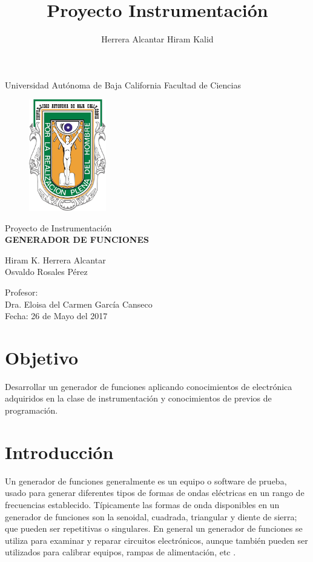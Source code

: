 \documentclass[11pt]{article}
\title{Proyecto Instrumentación}
\author{Herrera Alcantar Hiram Kalid}
\begin{document}
\begin{titlepage}
\begin{center}
\Huge Universidad Autónoma de Baja California
\huge Facultad de Ciencias
\vspace{0.8cm}
\begin{figure}[H]
\centering
\includegraphics[width=0.3\textwidth]{uabc}
\end{figure}
\huge Proyecto de Instrumentación\\
\huge\textbf{{GENERADOR DE FUNCIONES}}

\vspace{1.5cm}
\Huge{Hiram K. Herrera Alcantar \\ Osvaldo Rosales Pérez}

\vspace{1.5cm}
\huge{Profesor:}\\
\huge Dra. Eloisa del Carmen García Canseco \\
\vspace{1.5cm}
\LARGE Fecha: 26 de Mayo del 2017
\end{center}
\end{titlepage}
\newpage
\section{Objetivo}
Desarrollar un generador de funciones aplicando conocimientos de electrónica adquiridos en la clase de instrumentación y conocimientos de previos de programación.
\section{Introducción}
Un generador de funciones generalmente es un equipo o software de prueba, usado para generar diferentes tipos de formas de ondas eléctricas en un rango de frecuencias establecido. Típicamente las formas de onda disponibles en un generador de funciones son la senoidal, cuadrada, triangular y diente de sierra; que pueden ser repetitivas o singulares. En general un generador de funciones se utiliza para examinar y reparar circuitos electrónicos, aunque también pueden ser utilizados para calibrar equipos, rampas de alimentación, etc \cite{klaassen1996electronic}.
\end{document}
